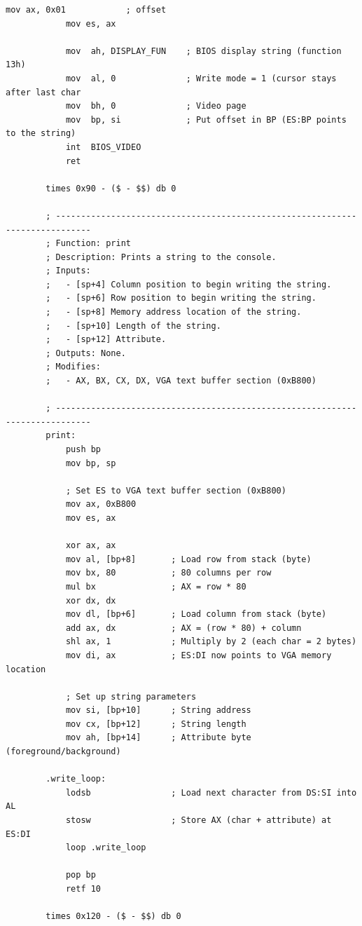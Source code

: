 \documentclass{article}
\begin{document}
\begin{lstlisting}[caption={os623V04.asm listing}, captionpos=t]
            mov ax, 0x01            ; offset
            mov es, ax

            mov  ah, DISPLAY_FUN    ; BIOS display string (function 13h)
            mov  al, 0              ; Write mode = 1 (cursor stays after last char
            mov  bh, 0              ; Video page
            mov  bp, si             ; Put offset in BP (ES:BP points to the string)
            int  BIOS_VIDEO
            ret

        times 0x90 - ($ - $$) db 0

        ; -----------------------------------------------------------------------------
        ; Function: print
        ; Description: Prints a string to the console.
        ; Inputs:
        ;   - [sp+4] Column position to begin writing the string.
        ;   - [sp+6] Row position to begin writing the string.
        ;   - [sp+8] Memory address location of the string.
        ;   - [sp+10] Length of the string.
        ;   - [sp+12] Attribute.
        ; Outputs: None.
        ; Modifies:
        ;   - AX, BX, CX, DX, VGA text buffer section (0xB800)

        ; -----------------------------------------------------------------------------
        print:
            push bp
            mov bp, sp

            ; Set ES to VGA text buffer section (0xB800)
            mov ax, 0xB800
            mov es, ax

            xor ax, ax
            mov al, [bp+8]       ; Load row from stack (byte)
            mov bx, 80           ; 80 columns per row
            mul bx               ; AX = row * 80
            xor dx, dx
            mov dl, [bp+6]       ; Load column from stack (byte)
            add ax, dx           ; AX = (row * 80) + column
            shl ax, 1            ; Multiply by 2 (each char = 2 bytes)
            mov di, ax           ; ES:DI now points to VGA memory location

            ; Set up string parameters
            mov si, [bp+10]      ; String address
            mov cx, [bp+12]      ; String length
            mov ah, [bp+14]      ; Attribute byte (foreground/background)

        .write_loop:
            lodsb                ; Load next character from DS:SI into AL
            stosw                ; Store AX (char + attribute) at ES:DI
            loop .write_loop

            pop bp
            retf 10

        times 0x120 - ($ - $$) db 0


\end{lstlisting}
\end{document}
